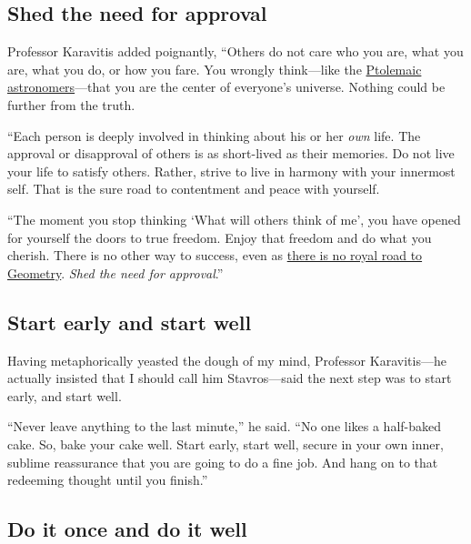 \documentclass[
  a4paper,
]{article}
\begin{document}
\hypertarget{shed-the-need-for-approval}{%
\subsection{Shed the need for
approval}\label{shed-the-need-for-approval}}

Professor Karavitis added poignantly, ``Others do not care who you are,
what you are, what you do, or how you fare. You wrongly think---like the
\href{https://www.princeton.edu/~hos/mike/texts/ptolemy/ptolemy.html}{Ptolemaic
astronomers}---that you are the center of everyone's universe. Nothing
could be further from the truth.

``Each person is deeply involved in thinking about his or her \emph{own}
life. The approval or disapproval of others is as short-lived as their
memories. Do not live your life to satisfy others. Rather, strive to
live in harmony with your innermost self. That is the sure road to
contentment and peace with yourself.

``The moment you stop thinking `What will others think of me', you have
opened for yourself the doors to true freedom. Enjoy that freedom and do
what you cherish. There is no other way to success, even as
\href{https://idioms.thefreedictionary.com/royal+road+to}{there is no
royal road to Geometry}. \emph{Shed the need for approval}.''

\hypertarget{start-early-and-start-well}{%
\subsection{Start early and start
well}\label{start-early-and-start-well}}

Having metaphorically yeasted the dough of my mind, Professor
Karavitis---he actually insisted that I should call him Stavros---said
the next step was to start early, and start well.

``Never leave anything to the last minute,'' he said. ``No one likes a
half-baked cake. So, bake your cake well. Start early, start well,
secure in your own inner, sublime reassurance that you are going to do a
fine job. And hang on to that redeeming thought until you finish.''

\hypertarget{do-it-once-and-do-it-well}{%
\subsection{Do it once and do it well}\label{do-it-once-and-do-it-well}}
\end{document}

